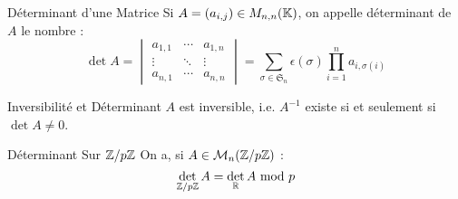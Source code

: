 \documentclass{cours}
\begin{document}
\begin{définition}{Déterminant d'une Matrice}{}
Si $A = (a_{i, j}) \in M_{n, n}(\mathbb{K})$, on appelle déterminant de $A$ le nombre : 
\[
    \det A = \begin{vmatrix}
        a_{1, 1} & \cdots & a_{1, n} \\
        \vdots   & \ddots & \vdots   \\
        a_{n, 1} & \cdots & a_{n, n}
    \end{vmatrix} = \sum_{\sigma \in \mathfrak{S}_{n}}\epsilon(\sigma)\prod_{i = 1}^{n}a_{i, \sigma(i)}
\]
\end{définition}
    \begin{propositionfr}{Inversibilité et Déterminant}{}
        $A$ est inversible, i.e. $A^{-1}$ existe si et seulement si $\det A \neq 0$.
    \end{propositionfr}

    \begin{propositionfr}{Déterminant Sur $\mathbb{Z}/p\mathbb{Z}$}{}
        On a, si $A \in \mathcal{M}_{n}(\mathbb{Z}/p\mathbb{Z})$ :
        \[
            \det\limits_{\mathbb{Z}/p\mathbb{Z}} A = \det_{\mathbb{R}} A\ {\rm mod }\ p
        \]
    \end{propositionfr}
        \begin{center}
        \end{center}
\end{document}

